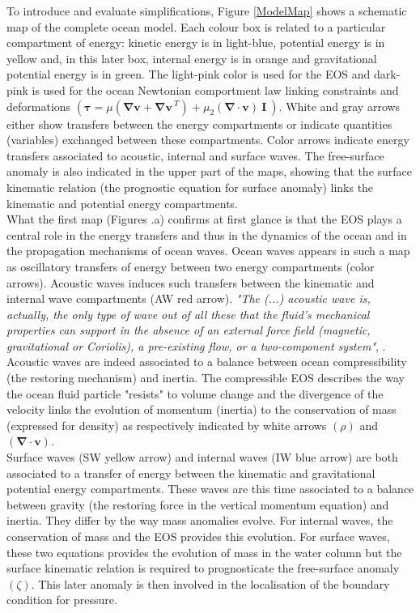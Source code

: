 \documentclass[a4paper,11pt]{article}
\begin{document}
To introduce and evaluate simplifications, Figure \ref{ModelMap} shows a schematic map of the complete ocean model. Each colour box is related to a particular compartment of energy: kinetic energy is in light-blue, potential energy is in yellow and, in this later box, internal energy is in orange and gravitational potential energy is in green. The light-pink color is used for the EOS and dark-pink is used for the ocean Newtonian comportment law linking constraints and deformations 
$\left(\mathbold{\tau}=\mu(\mathbf{\nabla}\mathbf{v}+\mathbf{\nabla}\mathbf{v}^{\ T})
 +\mu_2(\mathbf{\nabla}\cdot\mathbf{v})\ \mathbf{I}\ \right) $. 
White and gray arrows either show transfers between the energy compartments or indicate quantities (variables) exchanged between these compartments. Color arrows indicate energy transfers associated to acoustic, internal and surface waves.
The free-surface anomaly is also indicated in the upper part of the maps, showing that the surface kinematic relation (the prognostic equation for surface anomaly) links the kinematic and potential energy compartments.\\
What the first map (Figures .a) confirms at first glance is that the EOS plays a central role in the energy transfers and thus in the dynamics of the ocean and in the propagation mechanisms of ocean waves. 
Ocean waves appears in such a map as oscillatory transfers of energy between two energy compartments (color arrows). 
Acoustic waves induces such transfers between the kinematic and internal wave compartments (AW red arrow). \textit{"The (...) acoustic wave is, actually, the only type of wave out of all these that the fluid's mechanical properties can support in the absence of an external force field (magnetic, gravitational or Coriolis), a pre-existing flow, or a two-component system"}, \cite{lighthill_1967}. Acoustic waves are indeed associated to a balance between ocean compressibility (the restoring mechanism) and inertia. The compressible EOS describes the way the ocean fluid particle "resists" to volume change and the divergence of the velocity links the evolution of momentum (inertia) to the conservation of mass (expressed for density) as respectively indicated by white arrows $(\rho)$ and $(\mathbf{\nabla}\cdot\mathbf{v})$.\\
Surface waves (SW yellow arrow) and internal waves (IW blue arrow) are both associated to a transfer of energy between the kinematic and gravitational potential energy compartments. These waves are this time associated to a balance between gravity (the restoring force in the vertical momentum equation) and inertia. They differ by the way mass anomalies evolve. For internal waves, the conservation of mass and the EOS provides this evolution. For surface waves, these two equations provides the evolution of mass in the water column but the surface kinematic relation is required to prognosticate the free-surface anomaly $(\zeta)$. This later anomaly is then involved in the localisation of the boundary condition for pressure.\\
\end{document}
